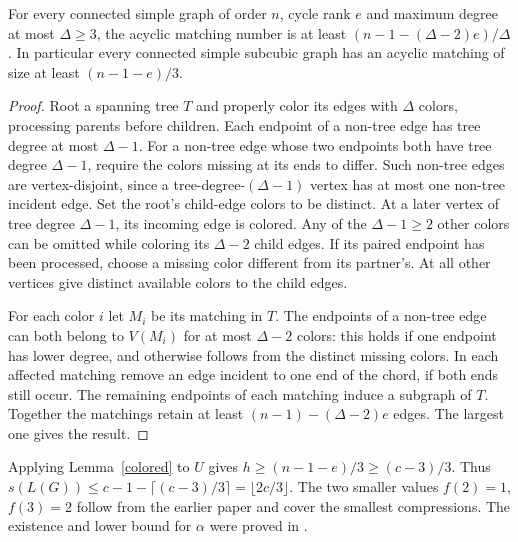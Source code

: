 \documentclass[11pt]{article}
\begin{document}
\begin{lemma}\label{colored}
For every connected simple graph of order $n$, cycle rank $e$ and maximum degree at most $\Delta\ge3$, the acyclic matching number is at least $(n-1-(\Delta-2)e)/\Delta$. In particular every connected simple subcubic graph has an acyclic matching of size at least $(n-1-e)/3$.
\end{lemma}
\begin{proof}
Root a spanning tree $T$ and properly color its edges with $\Delta$ colors, processing parents before children. Each endpoint of a non-tree edge has tree degree at most $\Delta-1$. For a non-tree edge whose two endpoints both have tree degree $\Delta-1$, require the colors missing at its ends to differ. Such non-tree edges are vertex-disjoint, since a tree-degree-$(\Delta-1)$ vertex has at most one non-tree incident edge. Set the root's child-edge colors to be distinct. At a later vertex of tree degree $\Delta-1$, its incoming edge is colored. Any of the $\Delta-1\ge2$ other colors can be omitted while coloring its $\Delta-2$ child edges. If its paired endpoint has been processed, choose a missing color different from its partner's. At all other vertices give distinct available colors to the child edges.

For each color $i$ let $M_i$ be its matching in $T$. The endpoints of a non-tree edge can both belong to $V(M_i)$ for at most $\Delta-2$ colors: this holds if one endpoint has lower degree, and otherwise follows from the distinct missing colors. In each affected matching remove an edge incident to one end of the chord, if both ends still occur. The remaining endpoints of each matching induce a subgraph of $T$. Together the matchings retain at least $(n-1)-(\Delta-2)e$ edges. The largest one gives the result.
\end{proof}
Applying Lemma~\ref{colored} to $U$ gives $h\ge(n-1-e)/3\ge(c-3)/3$. Thus $s(L(G))\le c-1-\lceil(c-3)/3\rceil=\lfloor2c/3\rfloor$. The two smaller values $f(2)=1$, $f(3)=2$ follow from the earlier paper and cover the smallest compressions. The existence and lower bound for $\alpha$ were proved in \cite{prev}.
\end{document}

